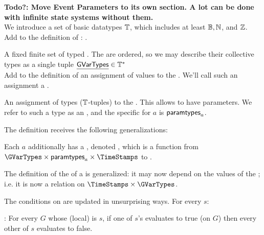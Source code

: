 \documentclass[12pt]{article}
\begin{document}
{\bf Todo?: Move Event Parameters to its own section. A lot can be done with infinite state systems without them.} \\

We introduce a set of basic datatypes $\mathbb{T}$, which includes at least $\mathbb{B}, \mathbb{N}$, and $\mathbb{Z}$. Add to the definition of \Contract:
.
\begin{LPPI}
\item A fixed finite set of typed . The \GVars are ordered, so we may describe their collective types as a single tuple $\underline{{\sf GVarTypes}} \in \mathbb{T}^* $\\
 Add to the definition of \GlobalState an assignment of values to the \GVars. We'll call such an assignment a .

\item An assignment of types ($\mathbb{T}$-tuples) to the \Actions. This allows \Events to have parameters. We refer to such a type as an , and the specific \AParamsDomain for \Action $a$ is $\textsf{paramtypes}_{a}$.
\end{LPPI}
\noindent The \Event definition receives the following generalizations:
\begin{LPPI}
\item Each \Action $a$ additionally has a \gvTransform, denoted , which is a function from $\GVarTypes \times \itsAParamsDomain{a} \times \TimeStamps$ to \GVarTypes. 
\item The definition of the \TGuard of a  is generalized: it may now depend on the values of the \GVars; i.e. it is now a relation on $\TimeStamps \times \text{\GVarTypes}$.
\end{LPPI}

The conditions on \TGuards are updated in unsurprising ways. For every \State $s$:

\noindent {}: For every \GlobalState $G$ whose (local) \State is $s$, if one of $s$'s \mustntrans evaluates to true (on $G$) then every other \TGuard of $s$ evaluates to false. 
\medskip
\end{document}
